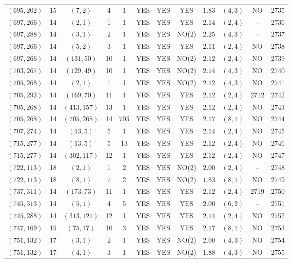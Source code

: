 \begin{longtable}{|c|c|c|c|c|c|c|c|c|c|c|c|}
$(695,202)$ & 15 & $(7,2)$ & 4 & 1 & YES & YES & YES & $1.83$ & $(4,3)$ & NO & 2735\\
$(697,266)$ & 14 & $(2,1)$ & 1 & 1 & YES & YES & YES & $2.14$ & $(2,4)$ & -- & 2736\\
$(697,288)$ & 14 & $(3,1)$ & 2 & 1 & YES & YES & NO(2) & $2.25$ & $(4,3)$ & -- & 2737\\
$(697,266)$ & 14 & $(5,2)$ & 3 & 1 & YES & YES & YES & $2.11$ & $(2,4)$ & NO & 2738\\
$(697,266)$ & 14 & $(131,50)$ & 10 & 1 & YES & YES & NO(2) & $2.12$ & $(2,4)$ & NO & 2739\\
$(703,267)$ & 14 & $(129,49)$ & 10 & 1 & YES & YES & NO(2) & $2.14$ & $(4,3)$ & NO & 2740\\
$(705,268)$ & 14 & $(2,1)$ & 1 & 1 & YES & YES & NO(2) & $2.12$ & $(4,3)$ & NO & 2741\\
$(705,292)$ & 14 & $(169,70)$ & 11 & 1 & YES & YES & YES & $2.12$ & $(2,4)$ & 2712 & 2742\\
$(705,268)$ & 14 & $(413,157)$ & 13 & 1 & YES & YES & YES & $2.12$ & $(2,4)$ & NO & 2743\\
$(705,268)$ & 14 & $(705,268)$ & 14 & 705 & YES & YES & YES & $2.17$ & $(8,1)$ & NO & 2744\\
$(707,274)$ & 14 & $(13,5)$ & 5 & 1 & YES & YES & YES & $2.14$ & $(2,4)$ & NO & 2745\\
$(715,277)$ & 14 & $(13,5)$ & 5 & 13 & YES & YES & YES & $2.12$ & $(2,4)$ & NO & 2746\\
$(715,277)$ & 14 & $(302,117)$ & 12 & 1 & YES & YES & YES & $2.12$ & $(2,4)$ & NO & 2747\\
$(722,113)$ & 18 & $(2,1)$ & 1 & 2 & YES & YES & NO(2) & $2.00$ & $(2,4)$ & -- & 2748\\
$(722,113)$ & 18 & $(8,1)$ & 7 & 2 & YES & YES & NO(2) & $1.83$ & $(8,1)$ & NO & 2749\\
$(737,311)$ & 14 & $(173,73)$ & 11 & 1 & YES & YES & YES & $2.12$ & $(2,4)$ & 2719 & 2750\\
$(745,313)$ & 14 & $(5,1)$ & 4 & 5 & YES & YES & YES & $2.00$ & $(6,2)$ & -- & 2751\\
$(745,288)$ & 14 & $(313,121)$ & 12 & 1 & YES & YES & YES & $2.14$ & $(2,4)$ & NO & 2752\\
$(747,169)$ & 15 & $(75,17)$ & 10 & 3 & YES & YES & YES & $2.17$ & $(8,1)$ & NO & 2753\\
$(751,132)$ & 17 & $(3,1)$ & 2 & 1 & YES & YES & NO(2) & $2.00$ & $(4,3)$ & NO & 2754\\
$(751,132)$ & 17 & $(4,1)$ & 3 & 1 & YES & YES & NO(2) & $1.88$ & $(4,3)$ & NO & 2755\\

\end{longtable}

